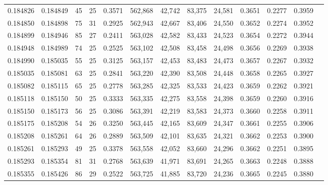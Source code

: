 \begin{tabular}{rrrrrrrrrrrrr}
0.184826 & 0.184849 &  45 &  25 &                                     0.3571 & 562,868 &  42,742 &  83,375 &  24,581 & 0.3651 & 0.2277 & 0.3959 \\
0.184850 & 0.184898 &  75 &  31 &                                     0.2925 & 562,943 &  42,667 &  83,406 &  24,550 & 0.3652 & 0.2274 & 0.3952 \\
0.184899 & 0.184946 &  85 &  27 &                                     0.2411 & 563,028 &  42,582 &  83,433 &  24,523 & 0.3654 & 0.2272 & 0.3944 \\
0.184948 & 0.184989 &  74 &  25 &                                     0.2525 & 563,102 &  42,508 &  83,458 &  24,498 & 0.3656 & 0.2269 & 0.3938 \\
0.184990 & 0.185035 &  55 &  25 &                                     0.3125 & 563,157 &  42,453 &  83,483 &  24,473 & 0.3657 & 0.2267 & 0.3932 \\
0.185035 & 0.185081 &  63 &  25 &                                     0.2841 & 563,220 &  42,390 &  83,508 &  24,448 & 0.3658 & 0.2265 & 0.3927 \\
0.185082 & 0.185115 &  65 &  25 &                                     0.2778 & 563,285 &  42,325 &  83,533 &  24,423 & 0.3659 & 0.2262 & 0.3921 \\
0.185118 & 0.185150 &  50 &  25 &                                     0.3333 & 563,335 &  42,275 &  83,558 &  24,398 & 0.3659 & 0.2260 & 0.3916 \\
0.185150 & 0.185173 &  56 &  25 &                                     0.3086 & 563,391 &  42,219 &  83,583 &  24,373 & 0.3660 & 0.2258 & 0.3911 \\
0.185175 & 0.185208 &  54 &  26 &                                     0.3250 & 563,445 &  42,165 &  83,609 &  24,347 & 0.3661 & 0.2255 & 0.3906 \\
0.185208 & 0.185261 &  64 &  26 &                                     0.2889 & 563,509 &  42,101 &  83,635 &  24,321 & 0.3662 & 0.2253 & 0.3900 \\
0.185261 & 0.185293 &  49 &  25 &                                     0.3378 & 563,558 &  42,052 &  83,660 &  24,296 & 0.3662 & 0.2251 & 0.3895 \\
0.185293 & 0.185354 &  81 &  31 &                                     0.2768 & 563,639 &  41,971 &  83,691 &  24,265 & 0.3663 & 0.2248 & 0.3888 \\
0.185355 & 0.185426 &  86 &  29 &                                     0.2522 & 563,725 &  41,885 &  83,720 &  24,236 & 0.3665 & 0.2245 & 0.3880 \\

\end{tabular}

